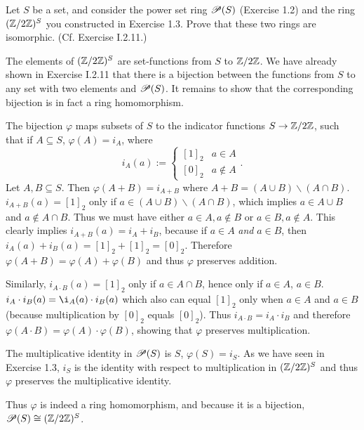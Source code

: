 \begin{problem}
	Let $S$ be a set, and consider the power set ring $\mathscr{P}(S)$ (Exercise 1.2) and the ring $(\mathbb{Z}/2\mathbb{Z})^S$ you constructed in Exercise 1.3. Prove that these two rings are isomorphic. (Cf. Exercise I.2.11.)
\end{problem}

\begin{solution}
	The elements of $(\mathbb{Z}/2\mathbb{Z})^S$ are set-functions from $S$ to $\mathbb{Z}/2\mathbb{Z}$. We have already shown in Exercise I.2.11 that there is a bijection between the functions from $S$ to any set with two elements and $\mathscr{P}(S)$. It remains to show that the corresponding bijection is in fact a ring homomorphism.
	
	The bijection $\varphi$ maps subsets of $S$ to the indicator functions $S \to \mathbb{Z}/2\mathbb{Z}$, such that if $A \subseteq S$, $\varphi(A) = i_A$, where
	\[
		i_A(a) :=
		\begin{cases}
			[1]_2 & a \in A \\
			[0]_2 & a \not \in A
		\end{cases} \text{.}
	\]
	Let $A, B \subseteq S$. Then $\varphi(A + B) = i_{A+B}$ where $A+B = (A \cup B) \smallsetminus (A \cap B)$. $i_{A+B}(a) = [1]_2$ only if $a \in (A \cup B) \smallsetminus (A \cap B)$, which implies $a \in A \cup B$ and $a \not \in A \cap B$. Thus we must have either $a \in A, a \not \in B$ or $a \in B, a \not \in A$. This clearly implies $i_{A+B}(a) = i_A + i_B$, because if $a \in A$ \emph{and} $a \in B$, then $i_A(a) + i_B(a) = [1]_2 + [1]_2 = [0]_2$. Therefore $\varphi(A + B) = \varphi(A) + \varphi(B)$ and thus $\varphi$ preserves addition.
	
	Similarly, $i_{A \cdot B}(a) = [1]_2$ only if $a \in A \cap B$, hence only if $a \in A$, $a \in B$. $i_A \cdot i_B (a) = \i_A(a) \cdot i_B(a)$ which also can equal $[1]_2$ only when $a \in A$ and $a \in B$ (because multiplication by $[0]_2$ equals $[0]_2$). Thus $i_{A \cdot B} = i_A \cdot i_B$ and therefore $\varphi(A \cdot B) = \varphi(A) \cdot \varphi(B)$, showing that $\varphi$ preserves multiplication.
	
	The multiplicative identity in $\mathscr{P}(S)$ is $S$, $\varphi(S) = i_S$. As we have seen in Exercise 1.3, $i_S$ is the identity with respect to multiplication in $(\mathbb{Z}/2\mathbb{Z})^S$ and thus $\varphi$ preserves the multiplicative identity.
	
	Thus $\varphi$ is indeed a ring homomorphism, and because it is a bijection, $\mathscr{P}(S) \cong (\mathbb{Z}/2\mathbb{Z})^S$.
\end{solution}


